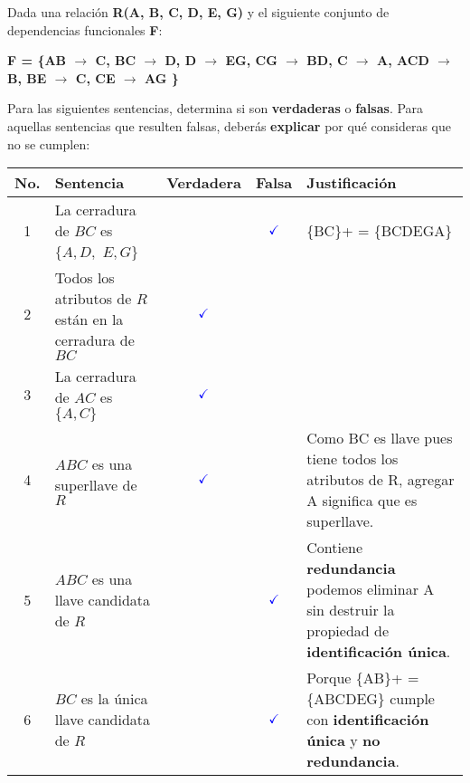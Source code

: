 Dada una relación \textbf{R(A, B, C, D, E, G)} y el siguiente conjunto de dependencias funcionales \textbf{F}:

\begin{center}
    \textbf{F = \{AB $\rightarrow$ C, BC $\rightarrow$ D, D $\rightarrow$ EG, CG $\rightarrow$ BD, C $\rightarrow$ A, ACD $\rightarrow$ B, BE $\rightarrow$ C, CE $\rightarrow$ AG \}} 
\end{center}

Para las siguientes sentencias, determina si son \textbf{verdaderas} o \textbf{falsas}. Para aquellas sentencias que resulten falsas, deberás \textbf{explicar} por qué consideras que no se cumplen:

\begin{table}[h!]
    \centering
    \renewcommand{\arraystretch}{1.5}
    \begin{tabular}{|c|m{5cm}|c|c|m{6cm}|}
    \hline
    \textbf{No.} & \textbf{Sentencia} & \textbf{Verdadera} & \textbf{Falsa} & \textbf{Justificación} \\ \hline

    1 & La cerradura de $BC$ es $\{A, D,$ $ E, G\}$ & & $\mathcolor{blue}{\checkmark}$ & \{BC\}+ = \{BCDEGA\} \\ \hline

    2 & Todos los atributos de $R$ están en la cerradura de $BC$ & $\mathcolor{blue}{\checkmark}$ & & \\ \hline

    3 & La cerradura de $AC$ es $\{A, C\}$ & $\mathcolor{blue}{\checkmark}$ & & \\ \hline

    4 & $ABC$ es una superllave de $R$ & $\mathcolor{blue}{\checkmark}$ & & Como BC es llave pues tiene todos los atributos de R, agregar A significa que es superllave. \\ \hline

    5 & $ABC$ es una llave candidata de $R$ & & $\mathcolor{blue}{\checkmark}$ & Contiene \textbf{redundancia} podemos eliminar A sin destruir la propiedad de \textbf{identificación única}. \\ \hline

    6 & $BC$ es la única llave candidata de $R$ &  & $\mathcolor{blue}{\checkmark}$ & Porque \{AB\}+ = \{ABCDEG\} cumple con \textbf{identificación única} y \textbf{no redundancia}.\\ \hline
    \end{tabular}
\end{table}